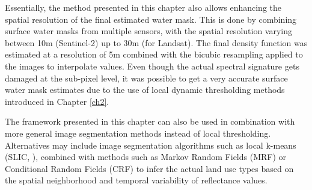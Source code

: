 Essentially, the method presented in this chapter also allows enhancing the spatial resolution of the final estimated water mask. This is done by combining surface water masks from multiple sensors, with the spatial resolution varying between 10m (Sentinel-2) up to 30m (for Landsat). The final density function was estimated at a resolution of 5m combined with the bicubic resampling applied to the images to interpolate values. Even though the actual spectral signature gets damaged at the sub-pixel level, it was possible to get a very accurate surface water mask estimates due to the use of local dynamic thresholding methods introduced in Chapter \ref{ch2}.

The framework presented in this chapter can also be used in combination with more general image segmentation methods instead of local thresholding. Alternatives may include image segmentation algorithms such as local k-means (SLIC, \citet{achanta2012slic}), combined with methods such as Markov Random Fields (MRF) or Conditional Random Fields (CRF) to infer the actual land use types based on the spatial neighborhood and temporal variability of reflectance values.
